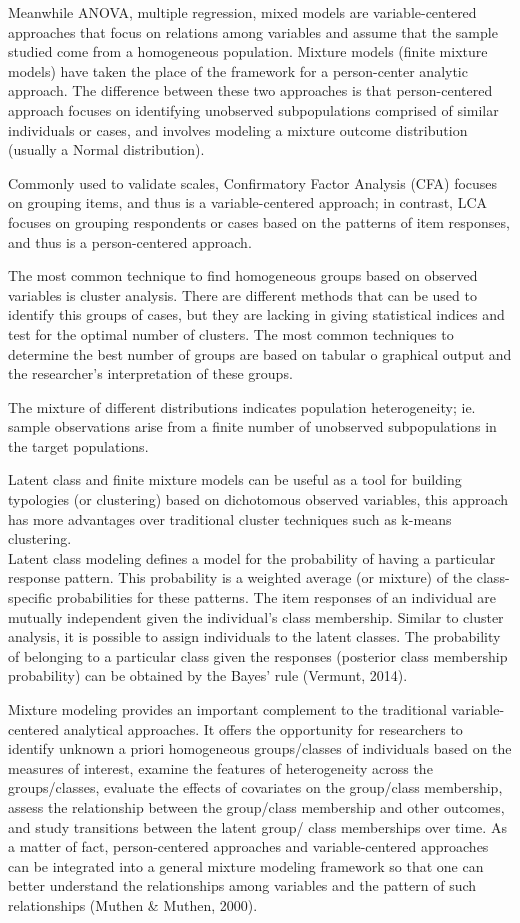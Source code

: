 \documentclass[12pt,a4paper,oneside]{reedthesis}
\begin{document}
Meanwhile ANOVA, multiple regression, mixed models are variable-centered approaches that focus on relations among variables and assume that the sample studied come from a homogeneous population. Mixture models (finite mixture models) have taken the place of the framework for a person-center analytic approach. The difference between these two approaches is that person-centered approach focuses on identifying unobserved subpopulations comprised of similar individuals or cases, and involves modeling a mixture outcome distribution (usually a Normal distribution).

Commonly used to validate scales, Confirmatory Factor Analysis (CFA) focuses on grouping items, and thus is a variable-centered approach; in contrast, LCA focuses on grouping respondents or cases based on the patterns of item responses, and thus is a person-centered approach.

The most common technique to find homogeneous groups based on observed variables is cluster analysis. There are different methods that can be used to identify this groups of cases, but they are lacking in giving statistical indices and test for the optimal number of clusters. The most common techniques to determine the best number of groups are based on tabular o graphical output and the researcher's interpretation of these groups.

The mixture of different distributions indicates population heterogeneity; ie. sample observations arise from a finite number of unobserved subpopulations in the target populations.

Latent class and finite mixture models can be useful as a tool for building typologies (or clustering) based on dichotomous observed variables, this approach has more advantages over traditional cluster techniques such as k-means clustering.\\
Latent class modeling defines a model for the probability of having a particular response pattern. This probability is a weighted average (or mixture) of the class-specific probabilities for these patterns. The item responses of an individual are mutually independent given the individual's class membership. Similar to cluster analysis, it is possible to assign individuals to the latent classes. The probability of belonging to a particular class given the responses (posterior class membership probability) can be obtained by the Bayes' rule (Vermunt, 2014).

Mixture modeling provides an important complement to the traditional variable-centered analytical approaches. It offers the opportunity for researchers to identify unknown a priori homogeneous groups/classes of individuals based on the measures of interest, examine the features of heterogeneity across the groups/classes, evaluate the effects of covariates on the group/class membership, assess the relationship between the group/class membership and other outcomes, and study transitions between the latent group/ class memberships over time. As a matter of fact, person-centered approaches and variable-centered approaches can be integrated into a general mixture modeling framework so that one can better understand the relationships among variables and the pattern of such relationships (Muthen \& Muthen, 2000).
\end{document}

